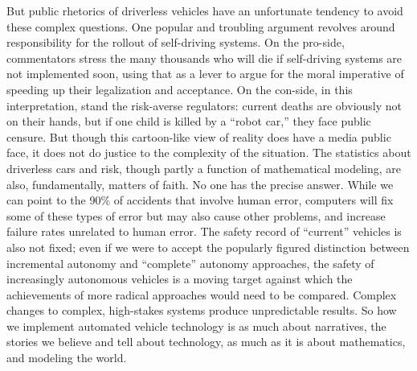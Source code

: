 
But public rhetorics of driverless vehicles have an unfortunate
tendency to avoid these complex questions. One popular and troubling
argument revolves around responsibility for the rollout of
self-driving systems. On the pro-side, commentators stress the many
thousands who will die if self-driving systems are not implemented
soon, using that as a lever to argue for the moral imperative of
speeding up their legalization and acceptance.\cite{???} On the con-side, in
this interpretation, stand the risk-averse regulators: current deaths
are obviously not on their hands, but if one child is killed by a
``robot car,'' they face public censure. But though this cartoon-like
view of reality does have a media public face, it does not do justice
to the complexity of the situation. The statistics about driverless
cars and risk, though partly a function of mathematical modeling, are
also, fundamentally, matters of faith. No one has the precise answer.
While we can point to the 90\% of accidents that involve human error,
computers will fix some of these types of error but may also cause
other problems, and increase failure rates unrelated to human error.
The safety record of ``current'' vehicles is also not fixed; even if
we were to accept the popularly figured distinction between
incremental autonomy and ``complete'' autonomy approaches, the safety
of increasingly autonomous vehicles is a moving target against which
the achievements of more radical approaches would need to be compared.
Complex changes to complex, high-stakes systems produce unpredictable
results. So how we implement automated vehicle technology is as much
about narratives, the stories we believe and tell about technology, as
much as it is about mathematics, and modeling the world. 

